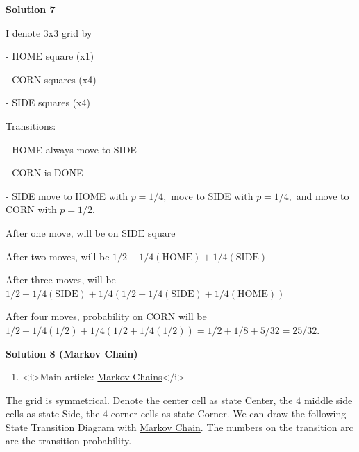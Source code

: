 \begin{enumerate}
 



\textbf{Solution 7}

I denote 3x3 grid by

 - HOME square (x1)

 - CORN squares (x4)

 - SIDE squares (x4)

 Transitions:

 - HOME always move to SIDE

 - CORN is DONE

 - SIDE move to HOME with $p=1/4,$ move to SIDE with $p=1/4,$ and move to CORN with $p=1/2.$

 After one move, will be on $\text{SIDE}$ square

 After two moves, will be $1/2 + 1/4 (\text{HOME}) + 1/4 (\text{SIDE})$

 After three moves, will be $1/2 + 1/4 (\text{SIDE}) + 1/4 (1/2 + 1/4(\text{SIDE}) + 1/4(\text{HOME}))$

 After four moves, probability on CORN will be $1/2 + 1/4 (1/2) + 1/4( 1/2 + 1/4(1/2)) = 1/2 + 1/8 + 5/32 = 25 / 32.$




\textbf{Solution 8 (Markov Chain)}


            \begin{enumerate}[label=(\roman*)]
                \item <i>Main article: \href{https://artofproblemsolving.com/wiki/index.php?title=Markov\_Chains}{Markov Chains}</i>
            \end{enumerate}
            The grid is symmetrical. Denote the center cell as state Center, the $4$ middle side cells as state Side, the $4$ corner cells as state Corner. We can draw the following State Transition Diagram with \href{https://en.wikipedia.org/wiki/Markov\_chain}{Markov Chain}. The numbers on the transition arc are the transition probability. 


\end{enumerate}
